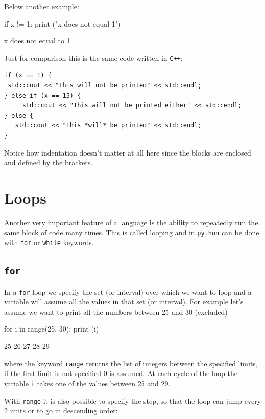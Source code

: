 Below another example:
\begin{ipython}
if x != 1:
    print ("x does not equal 1")
\end{ipython}
\begin{ioutput}
x does not equal to 1	
\end{ioutput}

Just for comparison this is the same code written in \texttt{C++}:

\begin{lstlisting}[style=mycpp]
if (x == 1) {
 std::cout << "This will not be printed" << std::endl;
} else if (x == 15) {
     std::cout << "This will not be printed either" << std::endl;
} else {
   std::cout << "This *will* be printed" << std::endl;
}
\end{lstlisting}

Notice how indentation doesn't matter at all here since the blocks are enclosed and defined by the brackets.

\section{Loops}\label{loops}

Another very important feature of a language is the ability to repeatedly run the same block of code many times. This is called looping and in \texttt{python} can be done with \texttt{for} or \texttt{while} keywords.

\subsection{\texttt{for}}\label{for}

In a \texttt{for} loop we specify the set (or interval) over which we want to loop and a variable will assume all the values in that set (or interval). For example let's assume we want to print all the numbers between 25 and 30 (excluded) 

\begin{ipython}
for i in range(25, 30):
    print (i)	
\end{ipython}
\begin{ioutput}
25
26
27
28
29	
\end{ioutput}
\noindent
where the keyword \texttt{range} returns the list of integers between the specified limits, if the first limit is not specified 0 is assumed.
At each cycle of the loop the variable \texttt{i} takes one of the values between 25 and 29. 

With \texttt{range} it is also possible to specify the step, so that the loop can jump every 2 units or to go in descending order:

